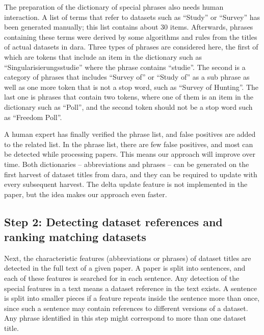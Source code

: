 \documentclass{IOS-Book-Article}
\newcommand{\dara}{\textsf{da\textbar ra}}
\begin{document}
The preparation of the dictionary of special phrases also needs human interaction. A list of terms that refer to datasets such as \enquote{Study} or \enquote{Survey} has been generated manually; this list contains about 30 items. Afterwards, phrases containing these terms were derived by some algorithms and rules from the titles of actual datasets in {\dara}. Three types of phrases are considered here, the first of which are tokens that include an item in the dictionary such as \enquote{Singularisierungsstudie} where the phrase contains \enquote{studie}.
The second is a category of phrases that includes \enquote{Survey of} or \enquote{Study of} as a sub phrase as well as one more token that is not a stop word, such as \enquote{Survey of Hunting}.
The last one is phrases that contain two tokens, where one of them is an item in the dictionary such as \enquote{Poll}, and the second token should not be a stop word such as \enquote{Freedom Poll}. 

A human expert has finally verified the phrase list, and false positives are added to the related list. In the phrase list, there are few false positives, and most can be detected while processing papers. This means our approach will improve over time.
Both dictionaries -- abbreviations and phrases -- can be generated on the first harvest of dataset titles from {\dara}, and they can be required to update with every subsequent harvest. The delta update feature is not implemented in the paper, but the idea makes our approach even faster.
 
\subsection{Step 2: Detecting dataset references and ranking matching datasets}
\label{sec:detecting-ranking}
Next, the characteristic features (abbreviations or phrases) of dataset titles are detected in the full text of a given paper. A paper is split into sentences, and each of these features is searched for in each sentence. 
Any detection of the special features in a text means a dataset reference in the text exists.
A sentence is split into smaller pieces if a feature repeats inside the sentence more than once, since such a sentence may contain references to different versions of a dataset. Any phrase identified in this step might correspond to more than one dataset title.
\end{document}
